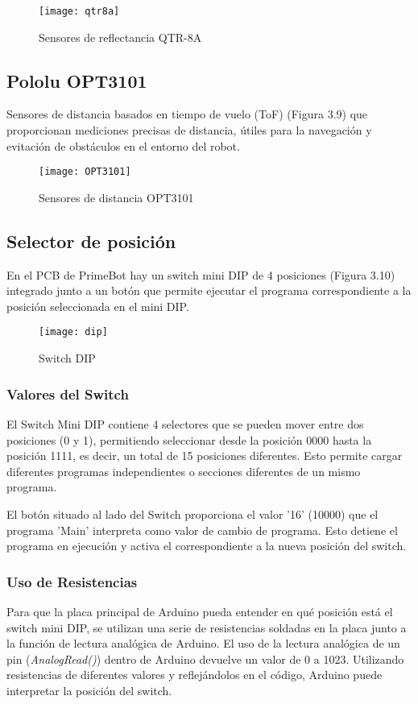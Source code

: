 \begin{figure}[h]
	\centering
	\texttt{[image: qtr8a]}
	\caption{Sensores de reflectancia QTR-8A}
	\label{fig:3.8}
\end{figure}

\subsection{Pololu OPT3101}\label{opt3101}
Sensores de distancia basados en tiempo de vuelo (ToF) (Figura 3.9) que proporcionan mediciones precisas de distancia, útiles para la navegación y evitación de obstáculos en el entorno del robot. ~\cite{pololuOPT3101}
\begin{figure}[h]
	\centering
	\texttt{[image: OPT3101]}
	\caption{Sensores de distancia OPT3101}
	\label{fig:3.9}
\end{figure}


\subsection{Selector de posición}\label{selector-de-posicion}
En el PCB de PrimeBot hay un switch mini DIP de 4 posiciones (Figura 3.10) integrado junto a un botón que permite ejecutar el programa correspondiente a la posición seleccionada en el mini DIP.
\begin{figure}[h]
	\centering
	\texttt{[image: dip]}
	\caption{Switch DIP}
	\label{fig:3.10}
\end{figure}


\subsubsection{Valores del Switch}
El Switch Mini DIP contiene 4 selectores que se pueden mover entre dos posiciones (0 y 1), permitiendo seleccionar desde la posición 0000 hasta la posición 1111, es decir, un total de 15 posiciones diferentes. Esto permite cargar diferentes programas independientes o secciones diferentes de un mismo programa.

El botón situado al lado del Switch proporciona el valor '16' (10000) que el programa 'Main' interpreta como valor de cambio de programa. Esto detiene el programa en ejecución y activa el correspondiente a la nueva posición del switch.

\subsubsection{Uso de Resistencias}
Para que la placa principal de Arduino pueda entender en qué posición está el switch mini DIP, se utilizan una serie de resistencias soldadas en la placa junto a la función de lectura analógica de Arduino. El uso de la lectura analógica de un pin (\emph{AnalogRead()}) dentro de Arduino devuelve un valor de 0 a 1023. Utilizando resistencias de diferentes valores y reflejándolos en el código, Arduino puede interpretar la posición del switch.

